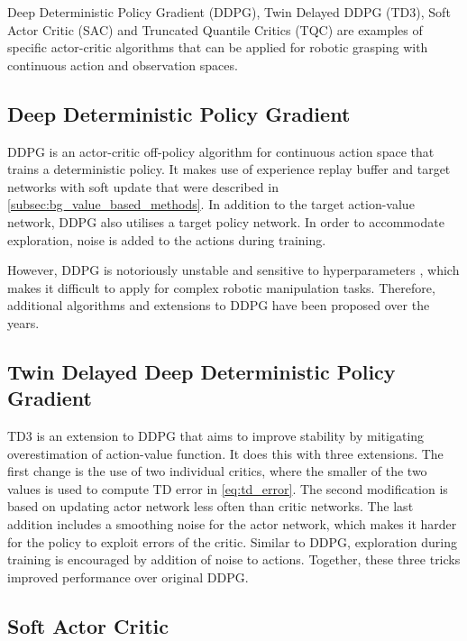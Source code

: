 Deep Deterministic Policy Gradient (DDPG), Twin Delayed DDPG (TD3), Soft Actor Critic (SAC) and Truncated Quantile Critics (TQC) are examples of specific actor-critic algorithms that can be applied for robotic grasping with continuous action and observation spaces.


\subsection{Deep Deterministic Policy Gradient}

DDPG \cite{lillicrap_continuous_2015} is an actor-critic off-policy algorithm for continuous action space that trains a deterministic policy. It makes use of experience replay buffer and target networks with soft update that were described in \autoref{subsec:bg_value_based_methods}. In addition to the target action-value network, DDPG also utilises a target policy network. In order to accommodate exploration, noise is added to the actions during training.

However, DDPG is notoriously unstable and sensitive to hyperparameters \cite{islam_reproducibility_2017, quillen_deep_2018}, which makes it difficult to apply for complex robotic manipulation tasks. Therefore, additional algorithms and extensions to DDPG have been proposed over the years.


\subsection{Twin Delayed Deep Deterministic Policy Gradient}

TD3 \cite{fujimoto_addressing_2018} is an extension to DDPG that aims to improve stability by mitigating overestimation of action-value function. It does this with three extensions. The first change is the use of two individual critics, where the smaller of the two values is used to compute TD error in \autoref{eq:td_error}. The second modification is based on updating actor network less often than critic networks. The last addition includes a smoothing noise for the actor network, which makes it harder for the policy to exploit errors of the critic. Similar to DDPG, exploration during training is encouraged by addition of noise to actions. Together, these three tricks improved performance over original DDPG.


\subsection{Soft Actor Critic}

